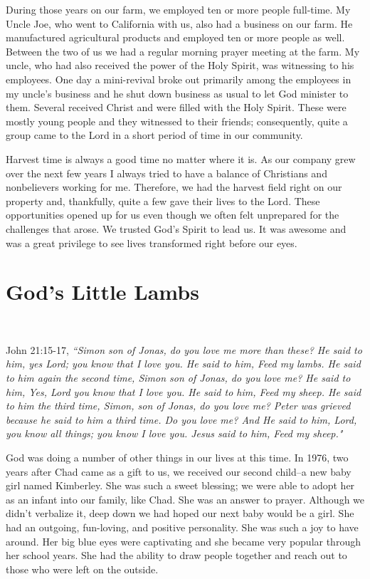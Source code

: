 \documentclass[oneside,12pt]{book}
\begin{document}
During those years on our farm, we employed ten or more people full-time. My Uncle Joe, who went to California with us, also had a business on our farm. He manufactured agricultural products and employed ten or more people as well. Between the two of us we had a regular morning prayer meeting at the farm. My uncle, who had also received the power of the Holy Spirit, was witnessing to his employees. One day a mini-revival broke out primarily among the employees in my uncle's business and he shut down business as usual to let God minister to them. Several received Christ and were filled with the Holy Spirit. These were mostly young people and they witnessed to their friends; consequently, quite a group came to the Lord in a short period of time in our community.

Harvest time is always a good time no matter where it is. As our company grew over the next few years I always tried to have a balance of Christians and nonbelievers working for me. Therefore, we had the harvest field right on our property and, thankfully, quite a few gave their lives to the Lord. These opportunities opened up for us even though we often felt unprepared for the challenges that arose. We trusted God's Spirit to lead us. It was awesome and was a great privilege to see lives transformed right before our eyes.


\section{God's Little Lambs}
\

John 21:15-17, \textit{``Simon son of Jonas, do you love me more than these? He said to him, yes Lord; you know that I love you. He said to him, Feed my lambs. He said to him again the second time, Simon son of Jonas, do you love me? He said to him, Yes, Lord you know that I love you. He said to him, Feed my sheep. He said to him the third time, Simon, son of Jonas, do you love me? Peter was grieved because he said to him a third time. Do you love me? And He said to him, Lord, you know all things; you know I love you. Jesus said to him, Feed my sheep."}

God was doing a number of other things in our lives at this time. In 1976, two years after Chad came as a gift to us, we received our second child--a new baby girl named Kimberley. She was such a sweet blessing; we were able to adopt her as an infant into our family, like Chad. She was an answer to prayer. Although we didn't verbalize it, deep down we had hoped our next baby would be a girl. She had an outgoing, fun-loving, and positive personality. She was such a joy to have around. Her big blue eyes were captivating and she became very popular through her school years. She had the ability to draw people together and reach out to those who were left on the outside.
\end{document}
